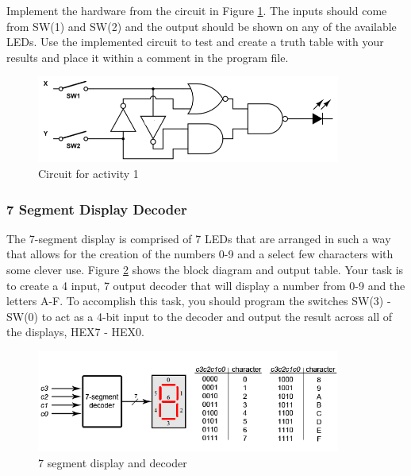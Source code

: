 Implement the hardware from the circuit in Figure \ref{fig:circuit1}. The inputs should come from SW(1) and SW(2) and the output should be shown on any of the available LEDs. Use the implemented circuit to test and create a truth table with your results and place it within a comment in the program file.

\begin{figure}[H]
	\centering
	\includegraphics[width=100mm]{Lab1/figures/circuit1.png}
	\caption{Circuit for activity 1}
	\label{fig:circuit1}
\end{figure}

\subsubsection{7 Segment Display Decoder}

The 7-segment display is comprised of 7 LEDs that are arranged in such a way that allows for the creation of the numbers 0-9 and a select few characters with some clever use. Figure \ref{fig:7seg} shows the block diagram and output table. Your task is to create a 4 input, 7 output decoder that will display a number from 0-9 and the letters A-F. To accomplish this task, you should program the switches SW(3) - SW(0) to act as a 4-bit input to the decoder and output the result across all of the displays, HEX7 - HEX0.

\begin{figure}[H]
	\centering
	\includegraphics[width=100mm]{Lab1/figures/7seg.png}
	\caption{7 segment display and decoder}
	\label{fig:7seg}
\end{figure}

